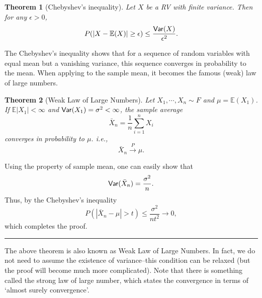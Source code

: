 \documentclass[twoside]{article}
\newcounter{lecnum}
\newtheorem{theorem}{Theorem}[lecnum]
\newenvironment{proof}{{\bf Proof:}}{\hfill\rule{2mm}{2mm}}
\newcommand\E{\mathbb{E}}
\begin{document}
\begin{theorem}[Chebyshev's inequality]
Let $X$ be a RV with finite variance.
Then for any $\epsilon>0$,
$$
P(|X-\E(X)|\geq \epsilon)\leq \frac{{\sf Var}(X)}{\epsilon^2}. 
$$
\end{theorem}
The Chebyshev's inequality shows that for a sequence of random variables with equal mean
but a vanishing variance, 
this sequence converges in probability to the mean. 
When applying to the sample mean,
it becomes the famous (weak) law of large numbers.



\begin{theorem}[Weak Law of Large Numbers]
Let $X_1,\cdots, X_n\sim F$ and $\mu = \E(X_1)$. 
If $\E|X_1|<\infty$ and ${\sf Var}(X_1) = \sigma^2<\infty$,
the sample average 
$$
\bar{X}_n =  \frac{1}{n}\sum_{i=1}^n X_i
$$
converges in probability to $\mu$.
i.e.,
$$
\bar{X}_n\overset{P}{\rightarrow} \mu.
$$

\end{theorem}
\begin{proof}
Using the property of sample mean, one can easily show that 
$$
{\sf Var}(\bar{X}_n) = \frac{\sigma^2}{n}.
$$
Thus, by the Chebyshev's inequality
$$
P(|\bar X_n - \mu|>t)\leq \frac{\sigma^2}{nt^2}\rightarrow 0,
$$
which completes the proof.


\end{proof}

The above theorem is also known as Weak Law of Large Numbers. 
In fact, we do not need to assume the existence of variance--this condition can be relaxed (but 
the proof will become much more complicated). 
Note that there is something called the strong law of large number, which 
states the convergence in terms of `almost surely convergence'. 







\end{document}
